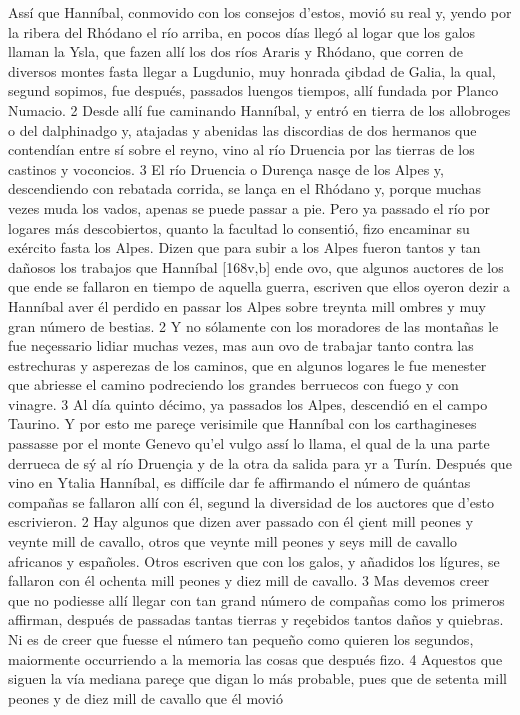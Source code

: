 \documentclass[11pt,twoside]{article}\makeatletter
\def\persName{}\def\name{}
\def\placeName{}
\begin{document}
\pend
{} Assí que  {\persName Hanníbal}, conmovido con los consejos d’estos, movió su real y, yendo por la ribera del  {\placeName Rhódano} el río arriba, en pocos días llegó al logar que los  {\name galos} llaman la  {\placeName Ysla}, que fazen allí los dos ríos Araris y Rhódano, que corren de diversos montes fasta llegar a Lugdunio, muy honrada çibdad de  {\placeName Galia}, la qual, segund sopimos, fue después, passados luengos tiempos, allí fundada por  {\persName Planco Numacio}. 2 Desde allí fue caminando  {\persName Hanníbal}, y entró en tierra de los allobroges o del dalphinadgo y, atajadas y abenidas las discordias de dos hermanos que contendían entre sí sobre el reyno, vino al río Druencia por las tierras de los castinos y voconcios. 3 El río  {\placeName Druencia o Durença} nasçe de los  {\placeName Alpes} y, descendiendo con rebatada corrida, se lança en el  {\placeName Rhódano} y, porque muchas vezes muda los vados, apenas se puede passar a pie. Pero ya passado el río por logares más descobiertos, quanto la facultad lo consentió, fizo encaminar su exército fasta los  {\placeName Alpes}.
\pend
{} Dizen que para subir a los  {\placeName Alpes} fueron tantos y tan dañosos los trabajos que  {\persName Hanníbal} %
[168v,b] ende ovo, que algunos auctores de los que ende se fallaron en tiempo de aquella guerra, escriven que ellos oyeron dezir a  {\persName Hanníbal} aver él perdido en passar los  {\placeName Alpes} sobre treynta mill ombres y muy gran número de bestias. 2 Y no sólamente con los moradores de las montañas le fue neçessario lidiar muchas vezes, mas aun ovo de trabajar tanto contra las estrechuras y asperezas de los caminos, que en algunos logares le fue menester que abriesse el camino podreciendo los grandes berruecos con fuego y con vinagre. 3 Al día quinto décimo, ya passados los  {\placeName Alpes}, descendió en el campo Taurino. Y por esto me pareçe verisimile que  {\persName Hanníbal} con los  {\name carthagineses} passasse por el  {\placeName monte Genevo} qu’el vulgo assí lo llama, el qual de la una parte derrueca de sý al  {\placeName río Druençia} y de la otra da salida para yr a  {\placeName Turín}.
\pend
{} Después que vino en  {\placeName Ytalia}  {\persName Hanníbal}, es diffícile dar fe affirmando el número de quántas compañas se fallaron allí con él, segund la diversidad de los auctores que d’esto escrivieron. 2 Hay algunos que dizen aver passado con él çient mill peones y veynte mill de cavallo, otros que veynte mill peones y seys mill de cavallo africanos y españoles. Otros escriven que con los galos, y añadidos los lígures, se fallaron con él ochenta mill peones y diez mill de cavallo. 3 Mas devemos creer que no podiesse allí llegar con tan grand número de compañas como los primeros affirman, después de passadas tantas tierras y reçebidos tantos daños y quiebras. Ni es de creer que fuesse el número tan pequeño como quieren los segundos, maiormente occurriendo a la memoria las cosas que después fizo. 4 Aquestos que siguen la vía mediana pareçe que digan lo más probable, pues que de setenta mill peones y de diez mill de cavallo que él movió %
\end{document}
